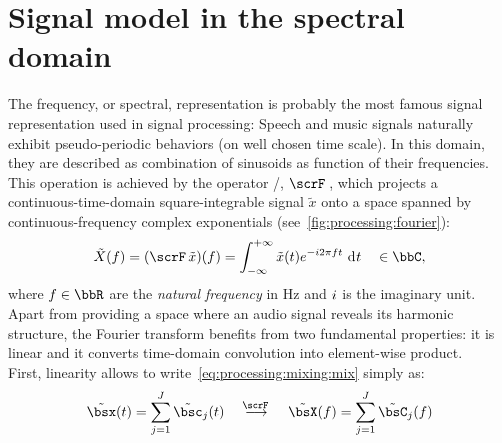 \section{Signal model in the spectral domain}\label{sec:processing:domains}%
The frequency, or spectral, representation is probably the most famous signal representation used in signal processing:
Speech and music signals naturally exhibit pseudo-periodic behaviors (on well chosen time scale).
In this domain, they are described as combination of sinusoids as function of their frequencies.
\\This operation is achieved by the operator \FTdef/, $\fourierTrans{}$, which projects a continuous-time-domain square-integrable signal $\tilde{x}$ onto a space spanned by continuous-frequency complex exponentials (see~\cref{fig:processing:fourier}):
\begin{equation}\label{eq:processing:ft}
    \tilde{X}(f) = (\fourierTrans{\tilde{x}})(f) =
        \int_{-\infty}^{+\infty}
        \tilde{x}(t)
        \cste^{-\csti 2 \pi f t}
        \,\kdiff{t} \quad \in \bbC
    ,
\end{equation}
where $f \in \bbR$ are the \textit{natural frequency} in $\si{\Hz}$ and ${i}$ is the imaginary unit.
\\Apart from providing a space where an audio signal reveals its harmonic structure, the Fourier transform benefits from two fundamental properties:
it is linear and it converts time-domain convolution into element-wise product.
\\First, linearity allows to write~\cref{eq:processing:mixing:mix} simply as:
\begin{equation}\label{eq:processing:ft:mix}
    \tilde{\mics}( t) = \sum_{\idxSrc=1}^{\numSrcs} \tilde{\imgs}_\idxSrc( t)
    \mathspace\overset{\fourierTrans{}}{\kto}\mathspace
    \tilde{\MICS}( f) = \sum_{\idxSrc=1}^{\numSrcs} \tilde{\IMGS}_\idxSrc( f)
\end{equation}
